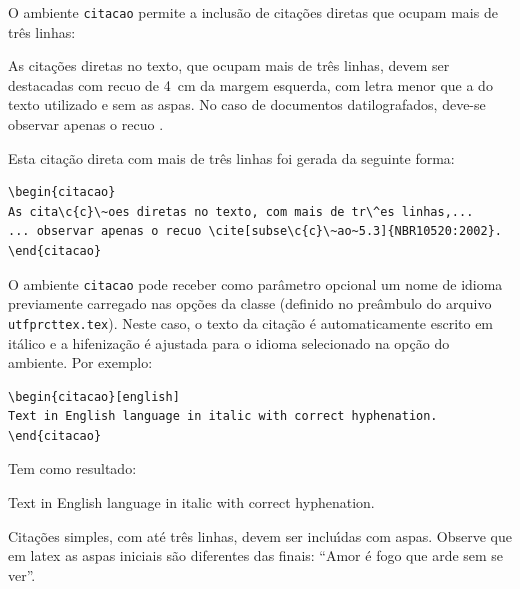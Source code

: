O ambiente \texttt{citacao} permite a inclus\~ao de cita\c{c}\~oes diretas que ocupam mais de tr\^es linhas:

\begin{citacao}%
As cita\c{c}\~oes diretas no texto, que ocupam mais de tr\^es linhas, devem ser destacadas com recuo de \SI{4}{cm} da margem esquerda, com letra menor que a do texto utilizado e sem as aspas. No caso de documentos datilografados, deve-se observar apenas o recuo \cite[subse\c{c}\~ao 5.3]{NBR10520:2002}.
\end{citacao}

\noindent Esta cita\c{c}\~ao direta com mais de tr\^es linhas foi gerada da seguinte forma:

\begin{SingleSpacing}%
\begin{verbatim}
\begin{citacao}
As cita\c{c}\~oes diretas no texto, com mais de tr\^es linhas,...
... observar apenas o recuo \cite[subse\c{c}\~ao~5.3]{NBR10520:2002}.
\end{citacao}
\end{verbatim}
\end{SingleSpacing}

O ambiente \texttt{citacao} pode receber como par\^ametro opcional um nome de idioma previamente carregado nas op\c{c}\~oes da classe (definido no pre\^ambulo do arquivo \texttt{utfprcttex.tex}). Neste caso, o texto da cita\c{c}\~ao \'e automaticamente escrito em it\'alico e a hifeniza\c{c}\~ao \'e ajustada para o idioma selecionado na op\c{c}\~ao do ambiente. Por exemplo:

\begin{SingleSpacing}%
\begin{verbatim}
\begin{citacao}[english]
Text in English language in italic with correct hyphenation.
\end{citacao}
\end{verbatim}
\end{SingleSpacing}

\noindent Tem como resultado:

\begin{citacao}[english]%
Text in English language in italic with correct hyphenation.
\end{citacao}

Cita\c{c}\~oes simples, com at\'e tr\^es linhas, devem ser inclu\'{\i}das com aspas. Observe que em \gls{latex} as aspas iniciais s\~ao diferentes das finais: ``Amor \'e fogo que arde sem se ver''.

